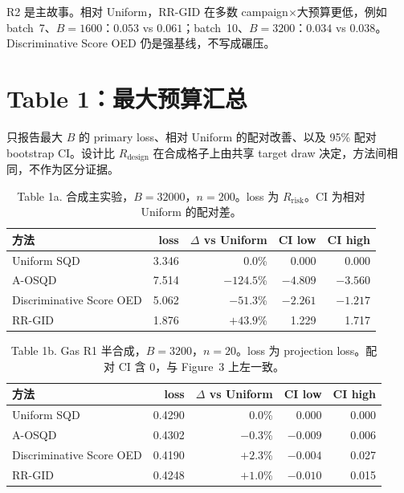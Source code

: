 \documentclass[UTF8,a4paper,11pt]{ctexart}
\begin{document}
R2 是主故事。相对 Uniform，RR-GID 在多数 campaign\(\times\)大预算更低，例如 batch~7、\(B=1600\)：\(0.053\) vs \(0.061\)；batch~10、\(B=3200\)：\(0.034\) vs \(0.038\)。Discriminative Score OED 仍是强基线，不写成碾压。

\section{Table 1：最大预算汇总}

只报告最大 \(B\) 的 primary loss、相对 Uniform 的配对改善、以及 95\% 配对 bootstrap CI。设计比 \(R_{\mathrm{design}}\) 在合成格子上由共享 target draw 决定，方法间相同，不作为区分证据。

\begin{table}[H]
\centering\small
\caption{Table 1a. 合成主实验，\(B=32000\)，\(n=200\)。loss 为 \(R_{\mathrm{risk}}\)。CI 为相对 Uniform 的配对差。}
\begin{tabular}{lrrrr}
\toprule
方法 & loss & \(\Delta\) vs Uniform & CI low & CI high \\
\midrule
Uniform SQD & 3.346 & 0.0\% & 0.000 & 0.000 \\
A-OSQD & 7.514 & \(-124.5\)\% & \(-4.809\) & \(-3.560\) \\
Discriminative Score OED & 5.062 & \(-51.3\)\% & \(-2.261\) & \(-1.217\) \\
RR-GID & 1.876 & \(+43.9\)\% & 1.229 & 1.717 \\
\bottomrule
\end{tabular}
\end{table}

\begin{table}[H]
\centering\small
\caption{Table 1b. Gas R1 半合成，\(B=3200\)，\(n=20\)。loss 为 projection loss。配对 CI 含 0，与 Figure~3 上左一致。}
\begin{tabular}{lrrrr}
\toprule
方法 & loss & \(\Delta\) vs Uniform & CI low & CI high \\
\midrule
Uniform SQD & 0.4290 & 0.0\% & 0.000 & 0.000 \\
A-OSQD & 0.4302 & \(-0.3\)\% & \(-0.009\) & 0.006 \\
Discriminative Score OED & 0.4190 & \(+2.3\)\% & \(-0.004\) & 0.027 \\
RR-GID & 0.4248 & \(+1.0\)\% & \(-0.010\) & 0.015 \\
\bottomrule
\end{tabular}
\end{table}
\end{document}
